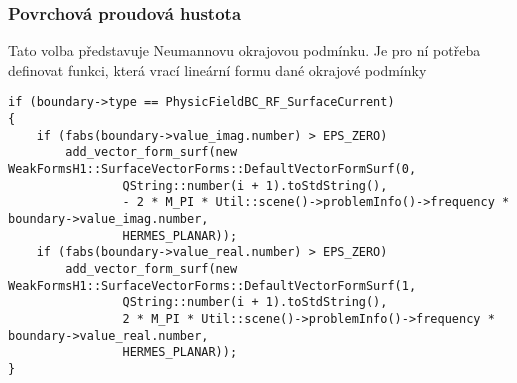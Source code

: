 \subsubsection*{Povrchová proudová hustota}
Tato volba představuje Neumannovu okrajovou podmínku. Je pro ní potřeba definovat funkci, která vrací lineární formu dané okrajové podmínky
\begin{verbatim}
if (boundary->type == PhysicFieldBC_RF_SurfaceCurrent)
{
    if (fabs(boundary->value_imag.number) > EPS_ZERO)
        add_vector_form_surf(new WeakFormsH1::SurfaceVectorForms::DefaultVectorFormSurf(0,
                QString::number(i + 1).toStdString(),
                - 2 * M_PI * Util::scene()->problemInfo()->frequency * boundary->value_imag.number,
                HERMES_PLANAR));
    if (fabs(boundary->value_real.number) > EPS_ZERO)
        add_vector_form_surf(new WeakFormsH1::SurfaceVectorForms::DefaultVectorFormSurf(1,
                QString::number(i + 1).toStdString(),
                2 * M_PI * Util::scene()->problemInfo()->frequency * boundary->value_real.number,
                HERMES_PLANAR));
}
\end{verbatim}

